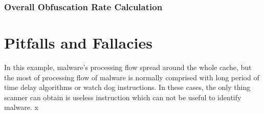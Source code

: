 \subsubsection{Overall Obfuscation Rate Calculation}

\section{Pitfalls and Fallacies}
In this example, malware's processing flow spread around the whole cache, but the most of processing flow of malware is normally comprised with long period of time delay algorithms or watch dog instructions. In these cases, the only thing scanner can obtain is useless instruction which can not be useful to identify malware. x

